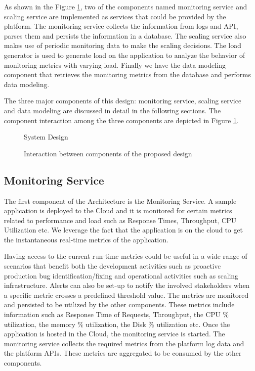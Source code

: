 \documentclass[article,type=msc,colorback,12pt,accentcolor=tud8b,table]{tudthesis}
\begin{document}
	As shown in the Figure \ref{fig:system_design}, two of the components named monitoring service and scaling service are implemented as services that could be provided by the platform. The monitoring service collects the information from logs and API, parses them and persists the information in a database. The scaling service also makes use of periodic monitoring data to make the scaling decisions. The load generator is used to generate load on the application to analyze the behavior of monitoring metrics with varying load. Finally we have the data modeling component that retrieves the monitoring metrics from the database and performs data modeling.
	
	The three major components of this design: monitoring service, scaling service and data modeling are discussed in detail in the following sections. The component interaction among the three components are depicted in Figure \ref{fig:system_design}.
 	
 			 \begin{figure}
 			 	\begin{center}
 			 	\end{center}
 			 	\caption{System Design}
 			 	\label{fig:system_design}
 			 \end{figure}
 

 			 \begin{figure}
 			 	\begin{center}
 			 	\end{center}
 			 	\caption{Interaction between components of the proposed design}
 			 	\label{fig:system_component_interaction}
 			 \end{figure}

	\subsection{Monitoring Service} 
 	The first component of the Architecture is the Monitoring Service. A sample application is deployed to the Cloud and it is monitored for certain metrics related to performance and load such as Response Times, Throughput, CPU Utilization etc. We leverage the fact that the application is on the cloud to get the instantaneous real-time metrics of the application. 
 	\par Having access to the current run-time metrics could be useful in a wide range of scenarios that benefit both the development activities such as proactive production bug identification/fixing and operational activities such as scaling infrastructure. Alerts can also be set-up to notify the involved stakeholders when a specific metric crosses a predefined threshold value. The metrics are monitored and persisted to be utilized by the other components. These metrics include information such as Response Time of Requests, Throughput, the CPU \% utilization, the memory \% utilization, the Disk \% utilization etc. Once the application is hosted in the Cloud, the monitoring service is started. 	The monitoring service collects the required metrics from the platform log data and the platform APIs. These metrics are aggregated to be consumed by the other components. 
 	
\end{document}
